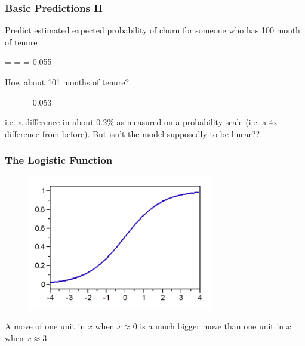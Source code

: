 \documentclass[handout]{beamer}
\begin{document}
\begin{frame}\frametitle{Basic Predictions II}

Predict estimated expected probability of churn for someone who has 100 month of tenure \pause

\beqn
\phat =  =  = 0.055
\eeqn

How about 101 months of tenure? \pause

\beqn
\phat =  =  = 0.053
\eeqn

i.e. a difference in about 0.2\% as measured on a probability scale (i.e. a 4x difference from before). But isn't the model supposedly to be linear??

\end{frame}

\begin{frame}\frametitle{The Logistic Function}

\begin{figure}
\centering
\includegraphics[width=3.2in]{logistic_function.png}
\end{figure}

A move of one unit in $x$ when $x \approx 0$ is a much bigger move than one unit in $x$ when $x \approx 3$

\end{frame}
\end{document}
